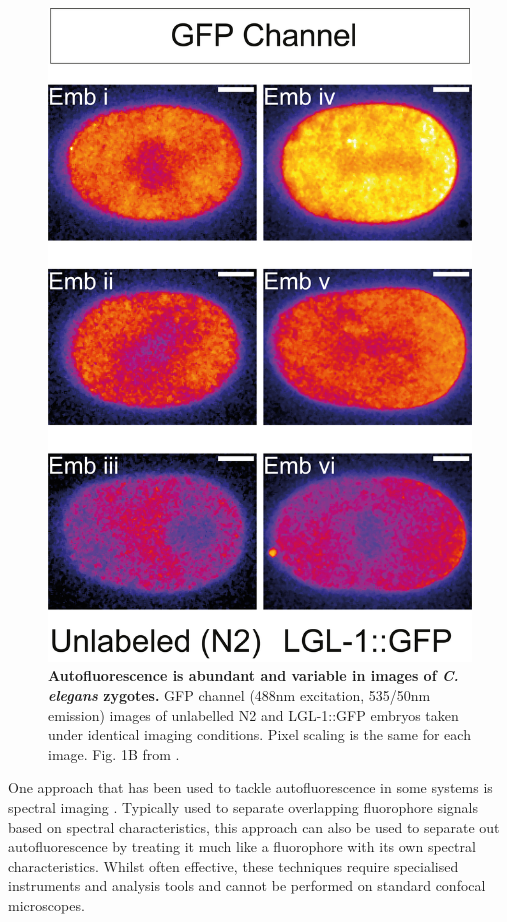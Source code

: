 \documentclass[12pt]{"article"}
\newcommand{\mycaption}[2]{\caption[#1]{\textbf{#1.} #2}}
\begin{document}
\begin{figure}
\includegraphics[scale=0.9]{saibr_n2_vs_lgl}
\mycaption{Autofluorescence is abundant and variable in images of \textit{C. elegans} zygotes}{GFP channel (488nm excitation, 535/50nm emission) images of unlabelled N2 and LGL-1::GFP embryos taken under identical imaging conditions. Pixel scaling is the same for each image. Fig. 1B from \textcite{Rodrigues2022}.}
\label{fig:saibr_n2_vs_lgl}
\end{figure}

One approach that has been used to tackle autofluorescence in some systems is spectral imaging \citep{Billinton2001}. Typically used to separate overlapping fluorophore signals based on spectral characteristics, this approach can also be used to separate out autofluorescence by treating it much like a fluorophore with its own spectral characteristics. Whilst often effective, these techniques require specialised instruments and analysis tools and cannot be performed on standard confocal microscopes.\\
\end{document}
